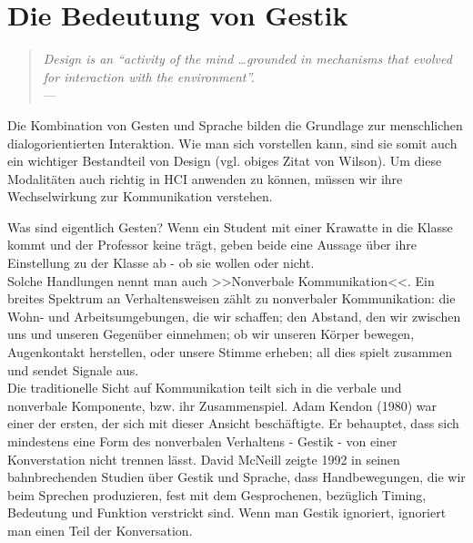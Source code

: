\section{Die Bedeutung von Gestik}\label{sec:Gestik}

\begin{quote}
	\begin{flushright}{\slshape    
	    Design is an “activity of the mind \ldots grounded in mechanisms that evolved for interaction with the environment”.} \\ \medskip
	    ---  \citep{Wilson:2002}
	\end{flushright}
\end{quote}

Die Kombination von Gesten und Sprache bilden die Grundlage zur menschlichen dialogorientierten Interaktion. Wie man sich vorstellen kann, sind sie somit auch ein wichtiger Bestandteil von Design (vgl. obiges Zitat von Wilson). Um diese Modalitäten auch richtig in \ac{HCI} anwenden zu können, müssen wir ihre Wechselwirkung zur Kommunikation verstehen.

\medskip Was sind eigentlich Gesten? Wenn ein Student mit einer Krawatte in die Klasse kommt und der Professor keine trägt, geben beide eine Aussage über ihre Einstellung zu der Klasse ab - ob sie wollen oder nicht. \\ Solche Handlungen nennt man auch >>Nonverbale Kommunikation<<. Ein breites Spektrum an Verhaltensweisen zählt zu nonverbaler Kommunikation: die Wohn- und Arbeitsumgebungen, die wir schaffen; den Abstand, den wir zwischen uns und unseren Gegenüber einnehmen; ob wir unseren Körper bewegen, Augenkontakt herstellen, oder unsere Stimme erheben; all dies spielt zusammen und sendet Signale aus. \\
Die traditionelle Sicht auf Kommunikation teilt sich in die verbale und nonverbale Komponente, bzw. ihr Zusammenspiel. Adam Kendon (1980) war einer der ersten, der sich mit dieser Ansicht beschäftigte. Er behauptet, dass sich mindestens eine Form des nonverbalen Verhaltens - Gestik - von einer Konverstation nicht trennen lässt. David McNeill zeigte 1992 in seinen bahnbrechenden Studien über Gestik und Sprache, dass Handbewegungen, die wir beim Sprechen produzieren, fest mit dem Gesprochenen, bezüglich Timing, Bedeutung und Funktion verstrickt sind. Wenn man Gestik ignoriert, ignoriert man einen Teil der Konversation.

